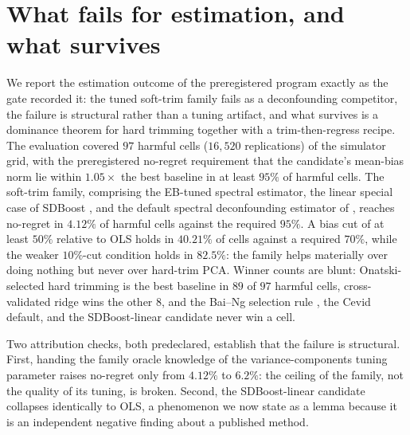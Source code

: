 \section{What fails for estimation, and what survives}
\label{sec:estimation}

We report the estimation outcome of the preregistered program exactly as the gate recorded it: the tuned soft-trim family fails as a deconfounding competitor, the failure is structural rather than a tuning artifact, and what survives is a dominance theorem for hard trimming together with a trim-then-regress recipe. The evaluation covered $97$ harmful cells ($16{,}520$ replications) of the simulator grid, with the preregistered no-regret requirement that the candidate's mean-bias norm lie within $1.05\times$ the best baseline in at least $95\%$ of harmful cells. The soft-trim family, comprising the EB-tuned spectral estimator, the linear special case of SDBoost \citep{nava2026sdboost}, and the default spectral deconfounding estimator of \citet{cevid2020spectral}, reaches no-regret in $4.12\%$ of harmful cells against the required $95\%$. A bias cut of at least $50\%$ relative to OLS holds in $40.21\%$ of cells against a required $70\%$, while the weaker $10\%$-cut condition holds in $82.5\%$: the family helps materially over doing nothing but never over hard-trim PCA. Winner counts are blunt: Onatski-selected hard trimming is the best baseline in $89$ of $97$ harmful cells, cross-validated ridge wins the other $8$, and the Bai--Ng selection rule \citep{bai2002determining}, the Cevid default, and the SDBoost-linear candidate never win a cell.

Two attribution checks, both predeclared, establish that the failure is structural. First, handing the family oracle knowledge of the variance-components tuning parameter raises no-regret only from $4.12\%$ to $6.2\%$: the ceiling of the family, not the quality of its tuning, is broken. Second, the SDBoost-linear candidate collapses identically to OLS, a phenomenon we now state as a lemma because it is an independent negative finding about a published method.

